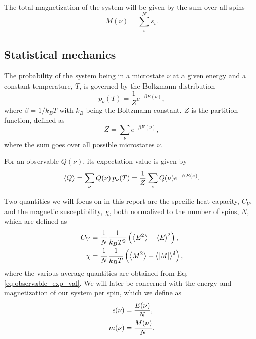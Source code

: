 The total magnetization of the system will be given by the sum over all spins 
\begin{equation}\label{eq:total_magnetization}
    M(\nu) = \sum_{i}^N s_i.
\end{equation}

\subsection{Statistical mechanics}\label{subsec_theory:statistical_mechanics}
The probability of the system being in a microstate $\nu$ at a given energy and a constant temperature, $T$, is governed by the Boltzmann distribution
\begin{equation}\label{eq:boltzmann_distr}
    p_\nu (T) = \frac{1}{Z}e^{-\beta E(\nu)},
\end{equation} 
where $\beta=1/k_B T$ with $k_B$ being the Boltzmann constant. $Z$ is the partition function, defined as 
\begin{equation}\label{eq:partition_function}
    Z = \sum_\nu e^{-\beta E(\nu)},
\end{equation}  
where the sum goes over all possible microstates $\nu$. 

For an observable $Q(\nu)$, its expectation value is given by 
\begin{equation}\label{eq:observable_exp_val}
    \expval{Q} = \sum_{\nu} Q(\nu)\, p_\nu(T) = \frac{1}{Z} \sum_\nu Q(\nu) e^{-\beta E(\nu)}.
\end{equation}

Two quantities we will focus on in this report are the specific heat capacity, $C_V$, and the magnetic susceptibility, $\chi$, both normalized to the number of spins, $N$, which are defined as 
\begin{align}
    C_V &= \frac{1}{N}\frac{1}{k_B T^2} \left( \expval{E^2} - \expval{E}^2 \right), \label{eq:C_V} \\ 
    \chi &= \frac{1}{N} \frac{1}{k_B T} \left( \expval{M^2} - \expval{\abs{M}}^2 \right), \label{eq:chi}
\end{align} 
where the various average quantities are obtained from Eq. \eqref{eq:observable_exp_val}. We will later be concerned with the energy and magnetization of our system per spin, which we define as 
\begin{align}
    \epsilon(\nu) &= \frac{E(\nu)}{N}, \label{eq:eps_} \\ 
    m(\nu) &= \frac{M(\nu)}{N}. \label{eq:m_}
\end{align}   


